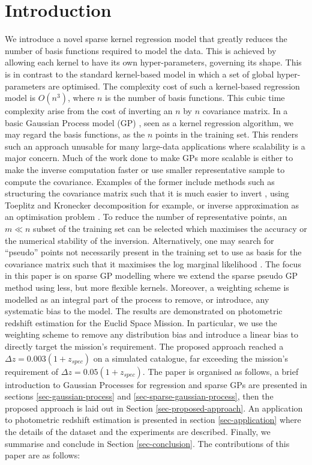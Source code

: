 \documentclass[useAMS,usenatbib,fleqn]{mn2e}
\begin{document}
\section{Introduction}
We introduce a novel sparse kernel regression model that greatly reduces the number of basis functions required to model the data. This is achieved by allowing each kernel to have its own hyper-parameters, governing its shape. This is in contrast to the standard kernel-based model in which a set of global hyper-parameters are optimised. The complexity cost of such a kernel-based regression model is $O(n^{3})$, where $n$ is the number of basis functions. This cubic time complexity arise from the cost of inverting an $n$ by $n$ covariance matrix. In a basic Gaussian Process model (GP) \cite{rasmussen+williams}, seen as a kernel regression algorithm, we may regard the basis functions, as the $n$ points in the training set. This renders such an approach unusable for many large-data applications where scalability is a major concern. Much of the work done to make GPs more scalable \cite{sparseGPcitations} is either to make the inverse computation faster or use smaller representative sample to compute the covariance. Examples of the former include methods such as structuring the covariance matrix such that it is much easier to invert \cite{}, using Toeplitz and Kronecker decomposition for example, or inverse approximation as an optimisation problem \cite{}. To reduce the number of representative points, an $m \ll n$ subset of the training set can be selected which maximises the accuracy or the numerical stability of the inversion. Alternatively, one may search for ``pseudo'' points not necessarily present in the training set to use as basis for the covariance matrix such that it maximises the log marginal likelihood \cite{}. The focus in this paper is on sparse GP modelling where we extend the sparse pseudo GP method using less, but more flexible kernels. Moreover, a weighting scheme is modelled as an integral part of the process to remove, or introduce, any systematic bias to the model. The results are demonstrated on photometric redshift estimation for the Euclid Space Mission. In particular, we use the weighting scheme to remove any distribution bias and introduce a linear bias to directly target the mission's requirement. The proposed approach reached a $\Delta z = 0.003(1+z_{spec})$ on a simulated catalogue, far exceeding the mission's requirement of $\Delta z = 0.05(1+z_{spec})$. The paper is organised as follows, a brief introduction to Gaussian Processes for regression and sparse GPs are presented in sections \ref{sec-gaussian-process} and \ref{sec-sparse-gaussian-process},  then the proposed approach is laid out in Section \ref{sec-proposed-approach}. An application to photometric redshift estimation is presented in section \ref{sec-application} where the details of the dataset and the experiments are described. Finally, we summarise and conclude in Section \ref{sec-conclusion}. The contributions of this paper are as follows:
\end{document}
